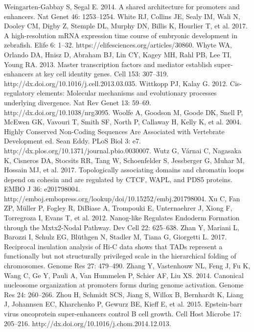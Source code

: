 \begin{thebibliography}{1}
	 Weingarten-Gabbay S, Segal E. 2014. A shared architecture for promoters and enhancers. Nat Genet 46: 1253–1254.
	 White RJ, Collins JE, Sealy IM, Wali N, Dooley CM, Digby Z, Stemple DL, Murphy DN, Billis K, Hourlier T, et al. 2017. A high-resolution mRNA expression time course of embryonic development in zebrafish. Elife 6: 1–32. https://elifesciences.org/articles/30860.
	 Whyte WA, Orlando DA, Hnisz D, Abraham BJ, Lin CY, Kagey MH, Rahl PB, Lee TI, Young RA. 2013. Master transcription factors and mediator establish super-enhancers at key cell identity genes. Cell 153: 307–319. http://dx.doi.org/10.1016/j.cell.2013.03.035.
	 Wittkopp PJ, Kalay G. 2012. Cis-regulatory elements: Molecular mechanisms and evolutionary processes underlying divergence. Nat Rev Genet 13: 59–69. http://dx.doi.org/10.1038/nrg3095.
	 Woolfe A, Goodson M, Goode DK, Snell P, McEwen GK, Vavouri T, Smith SF, North P, Callaway H, Kelly K, et al. 2004. Highly Conserved Non-Coding Sequences Are Associated with Vertebrate Development ed. Sean Eddy. PLoS Biol 3: e7. http://dx.plos.org/10.1371/journal.pbio.0030007.
	 Wutz G, Várnai C, Nagasaka K, Cisneros DA, Stocsits RR, Tang W, Schoenfelder S, Jessberger G, Muhar M, Hossain MJ, et al. 2017. Topologically associating domains and chromatin loops depend on cohesin and are regulated by CTCF, WAPL, and PDS5 proteins. EMBO J 36: e201798004. http://emboj.embopress.org/lookup/doi/10.15252/embj.201798004.
	 Xu C, Fan ZP, Müller P, Fogley R, DiBiase A, Trompouki E, Unternaehrer J, Xiong F, Torregroza I, Evans T, et al. 2012. Nanog-like Regulates Endoderm Formation through the Mxtx2-Nodal Pathway. Dev Cell 22: 625–638.
	 Zhan Y, Mariani L, Barozzi I, Schulz EG, Blüthgen N, Stadler M, Tiana G, Giorgetti L. 2017. Reciprocal insulation analysis of Hi-C data shows that TADs represent a functionally but not structurally privileged scale in the hierarchical folding of chromosomes. Genome Res 27: 479–490.
	 Zhang Y, Vastenhouw NL, Feng J, Fu K, Wang C, Ge Y, Pauli A, Van Hummelen P, Schier AF, Liu XS. 2014. Canonical nucleosome organization at promoters forms during genome activation. Genome Res 24: 260–266.
	 Zhou H, Schmidt SCS, Jiang S, Willox B, Bernhardt K, Liang J, Johannsen EC, Kharchenko P, Gewurz BE, Kieff E, et al. 2015. Epstein-barr virus oncoprotein super-enhancers control B cell growth. Cell Host Microbe 17: 205–216. http://dx.doi.org/10.1016/j.chom.2014.12.013.

\end{thebibliography}



